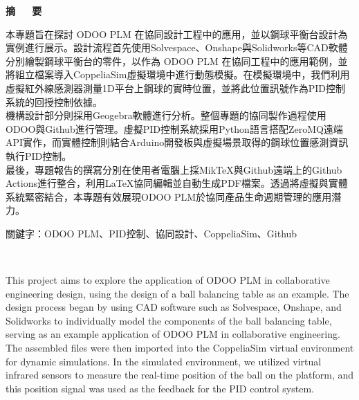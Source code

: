 \renewcommand{\baselinestretch}{1.5} %
\clearpage  %
\sectionef
{} %
\begin{center}
\LARGE\textbf{摘~~~要}\\
\end{center}

\justifying
\fontsize{14pt}{20pt}\sectionef\hspace{12pt}\quad 本專題旨在探討 ODOO PLM 在協同設計工程中的應用，並以鋼球平衡台設計為實例進行展示。設計流程首先使用Solvespace、Onshape與Solidworks等CAD軟體分別繪製鋼球平衡台的零件，以作為 ODOO PLM 在協同工程中的應用範例，並將組立檔案導入CoppeliaSim虛擬環境中進行動態模擬。在模擬環境中，我們利用虛擬紅外線感測器測量1D平台上鋼球的實時位置，並將此位置訊號作為PID控制系統的回授控制依據。\\

\fontsize{14pt}{20pt}\sectionef\hspace{12pt}\quad 機構設計部分則採用Geogebra軟體進行分析。整個專題的協同製作過程使用ODOO與Github進行管理。虛擬PID控制系統採用Python語言搭配ZeroMQ遠端API實作，而實體控制則結合Arduino開發板與虛擬場景取得的鋼球位置感測資訊執行PID控制。\\

\fontsize{14pt}{20pt}\sectionef\hspace{12pt}\quad 最後，專題報告的撰寫分別在使用者電腦上採MikTeX與Github遠端上的Github Actions進行整合，利用LaTeX協同編輯並自動生成PDF檔案。透過將虛擬與實體系統緊密結合，本專題有效展現ODOO PLM於協同產品生命週期管理的應用潛力。\\


\begin{hangparas}{1.5cm}{1}
\fontsize{14pt}{20pt}\sectionef
關鍵字：ODOO PLM、PID控制、協同設計、CoppeliaSim、Github
\end{hangparas}
\newpage
\begin{center}
\renewcommand{\baselinestretch}{1.5} %
\LARGE\textbf{}\\
\end{center}

\justifying\fontsize{14pt}{16pt}\sectionef\hspace{12pt}\quad This project aims to explore the application of ODOO PLM in collaborative engineering design, using the design of a ball balancing table as an example. The design process began by using CAD software such as Solvespace, Onshape, and Solidworks to individually model the components of the ball balancing table, serving as an example application of ODOO PLM in collaborative engineering. The assembled files were then imported into the CoppeliaSim virtual environment for dynamic simulations. In the simulated environment, we utilized virtual infrared sensors to measure the real-time position of the ball on the platform, and this position signal was used as the feedback for the PID control system.\\

